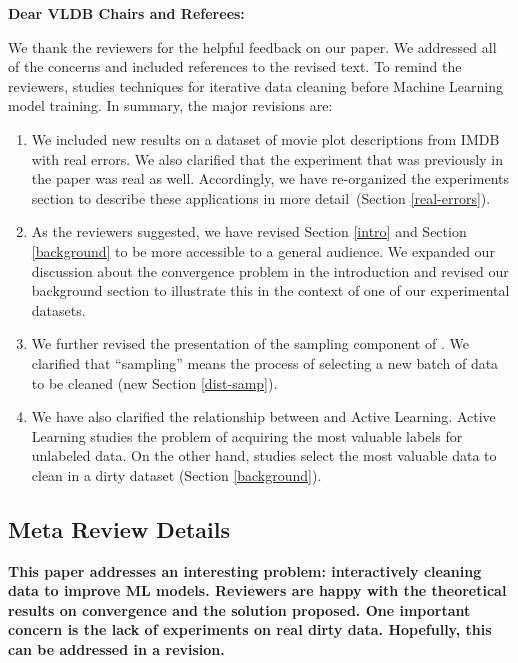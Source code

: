 {\noindent \normalsize \bf Dear VLDB Chairs and Referees: }

\vspace{.5em}

We thank the reviewers for the helpful feedback on our paper. 
We addressed all of the concerns and included references to the revised text. 
To remind the reviewers, \sys studies techniques for iterative data cleaning before Machine Learning model training.
In summary, the major revisions are:

\begin{enumerate}
\item We included new results on a dataset of movie plot descriptions from IMDB with real errors. We also clarified that the experiment that was previously in the paper was real as well. Accordingly, we have re-organized the experiments section to describe these applications in more detail~(Section \ref{real-errors}).

\item As the reviewers suggested, we have revised Section \ref{intro} and Section \ref{background} to be more accessible to a general audience. We expanded our discussion about the convergence problem in the introduction and revised our background section to illustrate this in the context of one of our experimental datasets.

\item We further revised the presentation of the sampling component of \sys. We clarified that ``sampling'' means the process of selecting a new batch of data to be cleaned (new Section \ref{dist-samp}). 

\item We have also clarified the relationship between \sys and Active Learning. Active Learning studies the problem of acquiring the most valuable labels for unlabeled data. On the other hand, \sys studies select the most valuable data to clean in a dirty dataset (Section \ref{background}). 

\end{enumerate}

\subsection*{Meta Review Details} 

\noindent\noindent \textbf{This paper addresses an interesting problem: interactively cleaning data to improve ML models. Reviewers are happy with the theoretical results on convergence and the solution proposed. One important concern is the lack of experiments on real dirty data. Hopefully, this can be addressed in a revision.}

